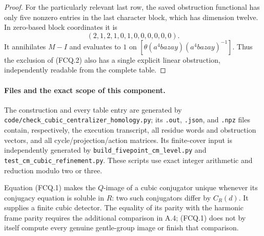 \begin{proof}
For the particularly relevant last row, the saved obstruction
functional has only five nonzero entries in the last character
block, which has dimension twelve.  In zero-based block coordinates
it is
\[
                  (2,1,2,1,0,1,0,0,0,0,0,0).
\]
It annihilates $M-I$ and evaluates to $1$ on
$[\theta( a^4 b a z a y)(a^4 b a z a y)^{-1}]$.
Thus the exclusion of \textup{(FCQ.2)} also has a single explicit
linear obstruction, independently readable from the complete table.
\end{proof}

\paragraph{Files and the exact scope of this component.}
The construction and every table entry are generated by
\texttt{code/check\_cubic\_centralizer\_homology.py};
its \texttt{.out}, \texttt{.json}, and \texttt{.npz} files contain,
respectively, the execution transcript, all residue words and
obstruction vectors, and all cycle/projection/action matrices.
Its finite-cover input is independently generated by
\texttt{build\_fivepoint\_cm\_level.py} and
\texttt{test\_cm\_cubic\_refinement.py}.  These scripts use exact
integer arithmetic and reduction modulo two or three.

Equation \textup{(FCQ.1)} makes the $Q$-image of a cubic conjugator
unique whenever its conjugacy equation is soluble in $R$: two such
conjugators differ by $C_R(d)$.  It supplies a finite cubic detector.
The equality of its parity with the harmonic frame parity requires
the additional comparison in A.4; \textup{(FCQ.1)} does not by itself
compute every genuine gentle-group image or finish that comparison.
